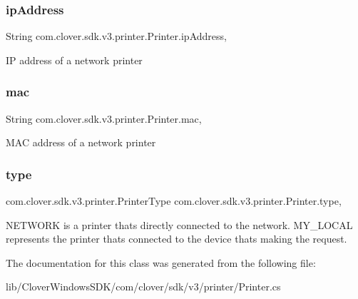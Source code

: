 \subsubsection{\texorpdfstring{ip\+Address}{ipAddress}}
{\footnotesize\ttfamily String com.\+clover.\+sdk.\+v3.\+printer.\+Printer.\+ip\+Address\hspace{0.3cm}{\ttfamily [get]}, {\ttfamily [set]}}



IP address of a network printer 

\mbox{\label{classcom_1_1clover_1_1sdk_1_1v3_1_1printer_1_1_printer_a825fc6d7756bc5cd403603cc05f73544}} 
\subsubsection{\texorpdfstring{mac}{mac}}
{\footnotesize\ttfamily String com.\+clover.\+sdk.\+v3.\+printer.\+Printer.\+mac\hspace{0.3cm}{\ttfamily [get]}, {\ttfamily [set]}}



M\+AC address of a network printer 

\mbox{\label{classcom_1_1clover_1_1sdk_1_1v3_1_1printer_1_1_printer_ab36bf7ec4bd09ce0ee2562f26b79475c}} 
\subsubsection{\texorpdfstring{type}{type}}
{\footnotesize\ttfamily com.\+clover.\+sdk.\+v3.\+printer.\+Printer\+Type com.\+clover.\+sdk.\+v3.\+printer.\+Printer.\+type\hspace{0.3cm}{\ttfamily [get]}, {\ttfamily [set]}}



N\+E\+T\+W\+O\+RK is a printer that\textquotesingle{}s directly connected to the network. M\+Y\+\_\+\+L\+O\+C\+AL represents the printer that\textquotesingle{}s connected to the device that\textquotesingle{}s making the request. 



The documentation for this class was generated from the following file\+:\begin{DoxyCompactItemize}
\item 
lib/\+Clover\+Windows\+S\+D\+K/com/clover/sdk/v3/printer/Printer.\+cs\end{DoxyCompactItemize}

